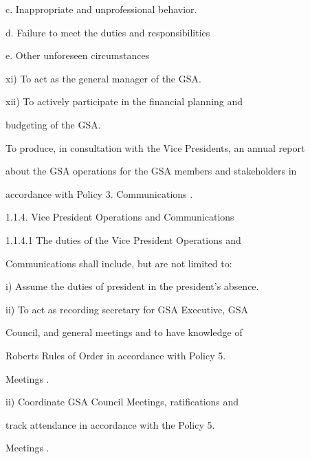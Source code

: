   

                            c. Inappropriate and unprofessional behavior.   

  

                            d. Failure to meet the duties and responsibilities   

  

                            e. Other unforeseen circumstances   

  

         xi)       To act as the general manager of the GSA.   

  

         xii)      To  actively  participate  in  the  financial  planning  and  

                   budgeting of the GSA.   

  

To produce, in consultation with the Vice Presidents, an annual report  

about the GSA operations for the GSA members and stakeholders in  

accordance with Policy 3. Communications .  

  

1.1.4. Vice President Operations and Communications  

1.1.4.1            The     duties      of    the    Vice      President        Operations         and  

         Communications shall include, but are not limited to:  

  

         i)        Assume the duties of president in the president’s absence.   

         ii)       To  act  as  recording  secretary  for  GSA  Executive,  GSA  

                   Council, and general meetings and to have knowledge of  

                   Roberts  Rules  of  Order  in  accordance  with  Policy  5.  

                   Meetings .   

  

         ii)       Coordinate   GSA   Council   Meetings,   ratifications   and  

                   track     attendance        in    accordance         with     the   Policy   5.  

                   Meetings .   

